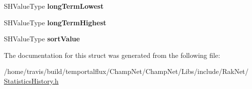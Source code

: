\begin{DoxyCompactItemize}
\item 
\hypertarget{struct_rak_net_1_1_statistics_history_1_1_time_and_value_queue_a9f05f322b0fa3f4b96c5cb753113753a}{S\-H\-Value\-Type {\bfseries long\-Term\-Lowest}}\label{struct_rak_net_1_1_statistics_history_1_1_time_and_value_queue_a9f05f322b0fa3f4b96c5cb753113753a}

\item 
\hypertarget{struct_rak_net_1_1_statistics_history_1_1_time_and_value_queue_ae70b819cdb67442c894b39993d4e2c7e}{S\-H\-Value\-Type {\bfseries long\-Term\-Highest}}\label{struct_rak_net_1_1_statistics_history_1_1_time_and_value_queue_ae70b819cdb67442c894b39993d4e2c7e}

\item 
\hypertarget{struct_rak_net_1_1_statistics_history_1_1_time_and_value_queue_ac5eba8d429f5f61741ffcd722ef4dcc6}{S\-H\-Value\-Type {\bfseries sort\-Value}}\label{struct_rak_net_1_1_statistics_history_1_1_time_and_value_queue_ac5eba8d429f5f61741ffcd722ef4dcc6}

\end{DoxyCompactItemize}


The documentation for this struct was generated from the following file\-:\begin{DoxyCompactItemize}
\item 
/home/travis/build/temportalflux/\-Champ\-Net/\-Champ\-Net/\-Libs/include/\-Rak\-Net/\hyperlink{_statistics_history_8h}{Statistics\-History.\-h}\end{DoxyCompactItemize}
